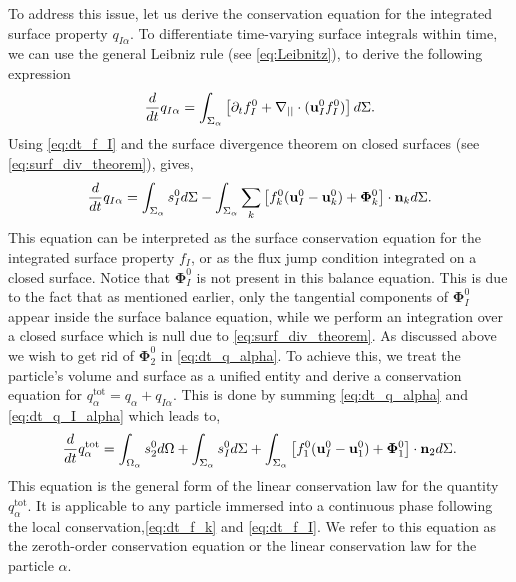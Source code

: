 To address this issue, let us derive the conservation equation for the integrated surface property $q_{I\alpha}$.
To differentiate time-varying surface integrals within time, we can use the general Leibniz rule (see \ref{eq:Leibnitz}), to derive the following expression
\begin{equation}
    \frac{d}{d t}  q_{I\alpha}
    = \int_{\Sigma_\alpha}  \left[
        \partial_t f_I^0
        +   \mathbf{\nabla}_{||} \cdot (\textbf{u}_I^0f_I^0)
    \right] d\Sigma.
    \label{eq:surface_derivative}
\end{equation}
Using \ref{eq:dt_f_I} and the surface divergence theorem on closed surfaces (see \ref{eq:surf_div_theorem}), gives,
\begin{equation}
    \frac{d}{d t}  q_{I\alpha}
    = \int_{\Sigma_\alpha}  
        s_I^0
     d\Sigma
    - \int_{\Sigma_\alpha} 
\sum_k \left[
    f_k^0 (\textbf{u}_I^0 - \textbf{u}_k^0)
    + \mathbf{\Phi}_k^0
    \right] \cdot \textbf{n}_k 
     d\Sigma.
    \label{eq:dt_q_I_alpha}
\end{equation}
This equation can be interpreted as the surface conservation equation for the integrated surface property $f_I$, or as the flux jump condition integrated on a closed surface. Notice that $\bm{\Phi}_{I}^0$ is not present in this balance equation. 
This is due to the fact that as mentioned earlier, only the tangential components of $\bm{\Phi}_{I}^0$ appear inside the surface balance equation, while we perform an integration over a closed surface which is null due to \ref{eq:surf_div_theorem}. As discussed above we wish to get rid of $\mathbf{\Phi}_2^0$ in \ref{eq:dt_q_alpha}. To achieve this, we treat the particle's volume and surface as a unified entity and derive a conservation equation for $q_\alpha^\text{tot} = q_\alpha + q_{I\alpha}$. 
This is done by summing \ref{eq:dt_q_alpha} and \ref{eq:dt_q_I_alpha} which leads to, 
\begin{equation}
    \frac{d}{d t}  q_\alpha^\text{tot}
    = 
    \int_{\Omega_\alpha}  s_2^0  d\Omega
    + \int_{\Sigma_\alpha}  s_I^0  d\Sigma
    + \int_{\Sigma_\alpha}  \left[
        f_1^0 (\textbf{u}_I^0-\textbf{u}_1^0) 
        + \mathbf{\Phi}_1^0 
        \right] \cdot \textbf{n}_2  d\Sigma. 
    \label{eq:dt_q_alpha_tot}
\end{equation}
This equation is the general form of the linear conservation law for the quantity $q_\alpha^\text{tot}$. %
It is applicable to any particle immersed into a continuous phase following the local conservation,\ref{eq:dt_f_k} and \ref{eq:dt_f_I}.
We refer to this equation as the zeroth-order conservation equation or the linear conservation law for the particle $\alpha$.

